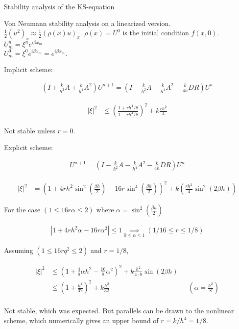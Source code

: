 
Stability analysis of the KS-equation

Von Neumann stability analysis on a linearized version. \\
$\frac{1}{2}(u^2)_x \approx \frac{1}{2}(\rho(x)u)_x$. $\rho(x) = U^0$ is the initial condition $f(x,0)$. 
$U_m^n = \xi^n e^{i \beta x_m}$ \\
$U_{m}^0 = \xi^0 e^{i\beta x_m} = e^{i\beta x_m}$.

\huge
Implicit scheme:

\Large
\begin{align*}
\left( I + \frac{k}{h^2}A + \frac{k}{h^4}A^2\right) U^{n+1} = \left( I - \frac{k}{h^2}A - \frac{k}{h^4}A^2 - \frac{k}{4h} DR \right)U^{n}
\end{align*}


\begin{align*}
|\xi |^2 &\le \left(\frac{1+rh^4/8}{1-rh^4/8}\right)^2 + k\frac{rh^2}{4}
\end{align*}

Not stable unless $r=0$.


\huge

Explicit scheme:

\Large
\begin{align*}
U^{n+1} = \left(I - \frac{k}{h^2}A - \frac{k}{h^4}A^2 - \frac{k}{4h} DR\right)U^{n} 
\end{align*}




\begin{align*}
|\xi |^2 &=  \left(1+4rh^2\sin^2\left(\frac{\beta h}{2}\right)-16r\sin^4\left(\frac{\beta h}{2}\right)\right)^2 + k\left(\frac{rh^2}{4}\sin^2(2\beta h)\right)
\end{align*}

For the case $(1 \le 16r\alpha \le 2)$ where $\alpha = \sin^2(\frac{\beta h}{2})$

\begin{align*}
 \left| 1+4rh^2\alpha -16r\alpha^2\right| \le 1 \underset{0\le \alpha\le 1}{\implies} \left(1/16 \le r \le 1/8 \right)
\end{align*} 

Assuming $(1 \le 16rq^2 \le 2)$ and $r = 1/8$, 

\begin{align*}
|\xi |^2 &\le \left(1 + \frac{4}{8}\alpha h^2 - \frac{16}{8}\alpha^2\right)^2 + k\frac{h^2}{4\cdot 8}\sin(2\beta h) \\
 &\le \left(1 + \frac{h^4}{32}\right)^2 + k\frac{h^2}{32} &\text{ } ( \alpha = \frac{h^2}{8} )\\
\end{align*}

Not stable, which was expected. But parallels can be drawn to the nonlinear scheme, which numerically gives an upper bound of $r = k/h^4 = 1/8$. 




